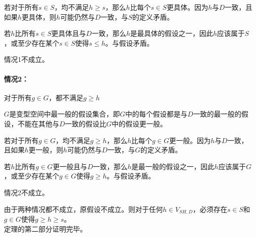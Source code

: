 \documentclass{article}
\begin{document}
    若对于所有\(s\in S\)，均不满足\(h\geq s\)，那么\(h\)比每个\(s\in S\)更具体。因为\(h\)与\(D\)一致，且如果\(h\)更具体，则\(h\)可能仍然与\(D\)一致，与\(S\)的定义矛盾。
    
    若\(h\)比所有\(s\in S\)更具体且与\(D\)一致，那么\(h\)是最具体的假设之一，因此\(h\)应该属于\(S\)，或至少存在某个\(s\in S\)使得\(s\leq h\)。与假设矛盾。
    
    情况1不成立。

    \paragraph{情况2：}对于所有\(g\in G\)，都不满足\(g\geq h\)
    
    \(G\)是变型空间中最一般的假设集合，即\(G\)中的每个假设都是与\(D\)一致的最一般的假设，不能在其他与\(D\)一致的假设比\(G\)中的假设更一般。

    若对于所有\(g\in G\)，均不满足\(g\geq h\)，那么\(h\)比每个\(g\in G\)更一般。因为\(h\)与\(D\)一致，且如果\(h\)更一般，则\(h\)可能仍然与\(D\)一致，与\(G\)的定义矛盾。
    
    若\(h\)比所有\(g\in G\)更一般且与\(D\)一致，那么\(h\)是最一般的假设之一，因此\(h\)应该属于\(G\)，或至少存在某个\(g\in G\)使得\(g\geq h\)。与假设矛盾。
    
    情况2不成立。

    由于两种情况都不成立，原假设不成立。则对于任何\(h\in V_{SH,D}\)，必须存在\(s\in S\)和\(g\in G\)使得\(g\geq h\geq s\)。\\

    定理的第二部分证明完毕。
\end{document}
